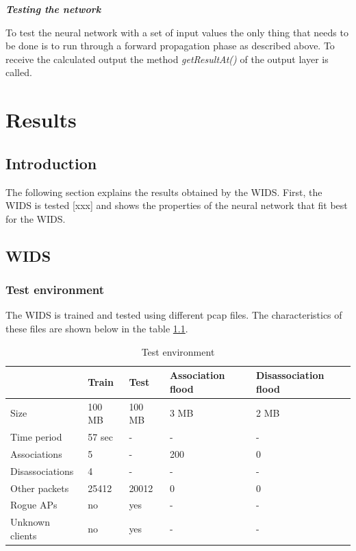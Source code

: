{\em {\bf Testing the network}}

To test the neural network with a set of input values the only thing that needs to be done is to run through a forward propagation phase as described above. To receive the calculated output the method {\em getResultAt()} of the output layer is called.





























\chapter{Results}

\section{Introduction}

The following section explains the results obtained by the WIDS. First, the WIDS is tested [xxx] and shows the properties of the neural network that fit best for the WIDS.

\section{WIDS}

\subsection{Test environment}

The WIDS is trained and tested using different pcap files. The characteristics of these files are shown below in the table \ref{test_env}.

\begin{table}[htbp]
	\begin{center}
		\begin{tabular}{|l|l|l|p{60pt}|p{75pt}|}
		\hline
		&\bf{Train}&\bf{Test}&\bf{Association flood}&\bf{Disassociation flood} \\
		\hline
		Size&100 MB&100 MB&3 MB&2 MB\\
		\hline
		Time period&57 sec&-&-&-\\
		\hline
		Associations&5&-&200&0\\
		\hline
		Disassociations&4&-&-&-\\
		\hline
		Other packets&25412&20012&0&0\\
		\hline
		Rogue APs&no&yes&-&-\\
		\hline
		Unknown clients&no&yes&-&-\\
		\hline
		\end{tabular}
	\end{center}
	\caption{Test environment}
	\label{test_env}
\end{table}

